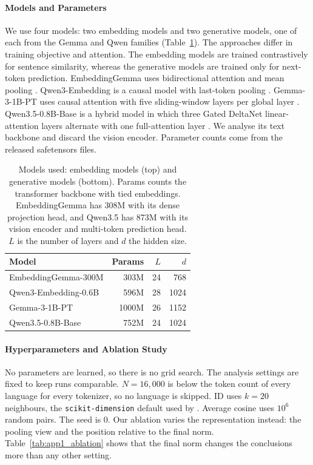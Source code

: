 \paragraph{Models and Parameters}
We use four models: two embedding models and two generative models, one of each from the Gemma and Qwen families (Table~\ref{tab:app1_models}). The approaches differ in training objective and attention. The embedding models are trained contrastively for sentence similarity, whereas the generative models are trained only for next-token prediction. EmbeddingGemma uses bidirectional attention and mean pooling \citep{vera-etal-2025-embeddinggemma}. Qwen3-Embedding is a causal model with last-token pooling \citep{zhang-etal-2025-qwen3embedding}. Gemma-3-1B-PT uses causal attention with five sliding-window layers per global layer \citep{gemmateam-2025-gemma3}. Qwen3.5-0.8B-Base is a hybrid model in which three Gated DeltaNet linear-attention layers alternate with one full-attention layer \citep{qwenteam-2026-qwen35}. We analyse its text backbone and discard the vision encoder. Parameter counts come from the released safetensors files.

\begin{table}[t]
\centering
\small
\begin{tabular}{lrrr}
\toprule
Model & Params & $L$ & $d$ \\
\midrule
EmbeddingGemma-300M & 303M & 24 & 768 \\
Qwen3-Embedding-0.6B & 596M & 28 & 1024 \\
\midrule
Gemma-3-1B-PT & 1000M & 26 & 1152 \\
Qwen3.5-0.8B-Base & 752M & 24 & 1024 \\
\bottomrule
\end{tabular}
\caption{Models used: embedding models (top) and generative models (bottom). Params counts the transformer backbone with tied embeddings. EmbeddingGemma has 308M with its dense projection head, and Qwen3.5 has 873M with its vision encoder and multi-token prediction head. $L$ is the number of layers and $d$ the hidden size.}
\label{tab:app1_models}
\end{table}

\paragraph{Hyperparameters and Ablation Study}
No parameters are learned, so there is no grid search. The analysis settings are fixed to keep runs comparable. $N = 16{,}000$ is below the token count of every language for every tokenizer, so no language is skipped. ID uses $k = 20$ neighbours, the \texttt{scikit-dimension} default used by \citet{rudman-etal-2022-isoscore}. Average cosine uses $10^6$ random pairs. The seed is 0. Our ablation varies the representation instead: the pooling view and the position relative to the final norm. Table~\ref{tab:app1_ablation} shows that the final norm changes the conclusions more than any other setting.


